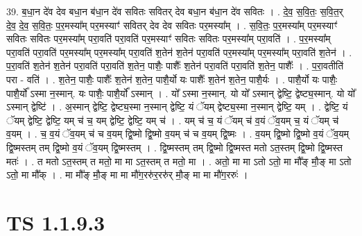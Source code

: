 \documentclass[17pt]{extarticle}
\begin{document}
39. ब॒धा॒न दे॑व देव बधा॒न ब॑धा॒न दे॑व सवितः सवितर् देव बधा॒न ब॑धा॒न दे॑व सवितः । . दे॒व॒ स॒वि॒तः॒ स॒वि॒त॒र् दे॒व॒ दे॒व॒ स॒वि॒तः॒ प॒र॒मस्या᳚म् पर॒मस्याꣳ॑ सवितर् देव देव सवितः पर॒मस्या᳚म् । . स॒वि॒तः॒ प॒र॒मस्या᳚म् पर॒मस्याꣳ॑ सवितः सवितः पर॒मस्या᳚म् परा॒वति॑ परा॒वति॑ पर॒मस्याꣳ॑ सवितः सवितः पर॒मस्या᳚म् परा॒वति॑ । . प॒र॒मस्या᳚म् परा॒वति॑ परा॒वति॑ पर॒मस्या᳚म् पर॒मस्या᳚म् परा॒वति॑ श॒तेन॑ श॒तेन॑ परा॒वति॑ पर॒मस्या᳚म् पर॒मस्या᳚म् परा॒वति॑ श॒तेन॑ । . प॒रा॒वति॑ श॒तेन॑ श॒तेन॑ परा॒वति॑ परा॒वति॑ श॒तेन॒ पाशैः॒ पाशैः᳚ श॒तेन॑ परा॒वति॑ परा॒वति॑ श॒तेन॒ पाशैः᳚ । . प॒रा॒वतीति॑ परा - वति॑ । . श॒तेन॒ पाशैः॒ पाशैः᳚ श॒तेन॑ श॒तेन॒ पाशै॒र्यो यः पाशैः᳚ श॒तेन॑ श॒तेन॒ पाशै॒र्यः । . पाशै॒र्यो यः पाशैः॒ पाशै॒र्यो᳚ ऽस्मा न॒स्मान्. यः पाशैः॒ पाशै॒र्यो᳚ ऽस्मान् । . यो᳚ ऽस्मा न॒स्मान्. यो यो᳚ ऽस्मान् द्वेष्टि॒ द्वेष्ट्य॒स्मान्. यो यो᳚ ऽस्मान् द्वेष्टि॑ । . अ॒स्मान् द्वेष्टि॒ द्वेष्ट्य॒स्मा न॒स्मान् द्वेष्टि॒ यं ॅयम् द्वेष्ट्य॒स्मा न॒स्मान् द्वेष्टि॒ यम् । . द्वेष्टि॒ यं ॅयम् द्वेष्टि॒ द्वेष्टि॒ यम् च॑ च॒ यम् द्वेष्टि॒ द्वेष्टि॒ यम् च॑ । . यम् च॑ च॒ यं ॅयम् च॑ व॒यं ॅव॒यम् च॒ यं ॅयम् च॑ व॒यम् । . च॒ व॒यं ॅव॒यम् च॑ च व॒यम् द्वि॒ष्मो द्वि॒ष्मो व॒यम् च॑ च व॒यम् द्वि॒ष्मः । . व॒यम् द्वि॒ष्मो द्वि॒ष्मो व॒यं ॅव॒यम् द्वि॒ष्मस्तम् तम् द्वि॒ष्मो व॒यं ॅव॒यम् द्वि॒ष्मस्तम् । . द्वि॒ष्मस्तम् तम् द्वि॒ष्मो द्वि॒ष्मस्त मतो ऽत॒स्तम् द्वि॒ष्मो द्वि॒ष्मस्त मतः॑ । . त मतो ऽत॒स्तम् त मतो॒ मा मा ऽत॒स्तम् त मतो॒ मा । . अतो॒ मा मा ऽतो ऽतो॒ मा मौ᳚ङ् मौ॒ङ् मा ऽतो ऽतो॒ मा मौ᳚क् । . मा मौ᳚ङ् मौ॒ङ् मा मा मौ॑ग॒ररु॑र॒ररु॑र् मौ॒ङ् मा मा मौ॑ग॒ररुः॑ । \newline
\pagebreak
{}

\section{ TS 1.1.9.3 }
\end{document}
